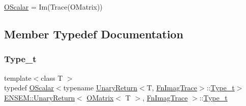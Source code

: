 \mbox{\hyperlink{classENSEM_1_1OScalar}{O\+Scalar}} = Im(\+Trace(\+O\+Matrix)) 

\subsection{Member Typedef Documentation}
\mbox{\label{structENSEM_1_1UnaryReturn_3_01OMatrix_3_01T_01_4_00_01FnImagTrace_01_4_a7b4a608d50b5637e2ca0d51ba6ff692b}} 
\subsubsection{\texorpdfstring{Type\_t}{Type\_t}\hspace{0.1cm}{\footnotesize\ttfamily [1/2]}}
{\footnotesize\ttfamily template$<$class T $>$ \\
typedef \mbox{\hyperlink{classENSEM_1_1OScalar}{O\+Scalar}}$<$typename \mbox{\hyperlink{structENSEM_1_1UnaryReturn}{Unary\+Return}}$<$T, \mbox{\hyperlink{structENSEM_1_1FnImagTrace}{Fn\+Imag\+Trace}}$>$\+::\mbox{\hyperlink{structENSEM_1_1UnaryReturn_3_01OMatrix_3_01T_01_4_00_01FnImagTrace_01_4_a7b4a608d50b5637e2ca0d51ba6ff692b}{Type\+\_\+t}}$>$ \mbox{\hyperlink{structENSEM_1_1UnaryReturn}{E\+N\+S\+E\+M\+::\+Unary\+Return}}$<$ \mbox{\hyperlink{classENSEM_1_1OMatrix}{O\+Matrix}}$<$ T $>$, \mbox{\hyperlink{structENSEM_1_1FnImagTrace}{Fn\+Imag\+Trace}} $>$\+::\mbox{\hyperlink{structENSEM_1_1UnaryReturn_3_01OMatrix_3_01T_01_4_00_01FnImagTrace_01_4_a7b4a608d50b5637e2ca0d51ba6ff692b}{Type\+\_\+t}}}

\mbox{\label{structENSEM_1_1UnaryReturn_3_01OMatrix_3_01T_01_4_00_01FnImagTrace_01_4_a7b4a608d50b5637e2ca0d51ba6ff692b}} 

